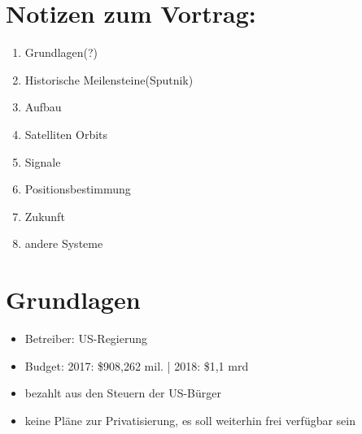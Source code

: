 \documentclass{scrartcl}
\begin{document}
    \section{Notizen zum Vortrag:}
    \begin{enumerate}
        \item Grundlagen(?)
        \item Historische Meilensteine(Sputnik)
        \item Aufbau
        \item Satelliten Orbits
        \item Signale
        \item Positionsbestimmung
        \item Zukunft
        \item andere Systeme
    \end{enumerate}

    \section{Grundlagen}
    \begin{itemize}
        \item Betreiber: US-Regierung
        \item Budget: 2017: \$908,262 mil. | 2018: \$1,1 mrd
        \item bezahlt aus den Steuern der US-Bürger
        \item keine Pläne zur Privatisierung, es soll weiterhin frei verfügbar sein
    \end{itemize}
\end{document}
